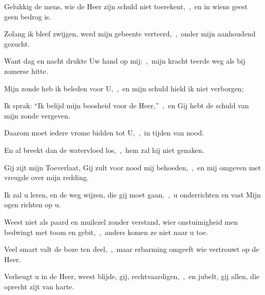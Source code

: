 \documentclass[12pt,twoside,a5paper]{article}
\begin{document}
\begin{halfparskip}
  Gelukkig de mens, wie de Heer zijn schuld niet toerekent,~\sep\ en in wiens geest geen bedrog is.

  Zolang ik bleef zwijgen, werd mijn gebeente verteerd,~\sep\ onder mijn aanhoudend gezucht.

  Want dag en nacht drukte Uw hand op mij;~\sep\ mijn kracht teerde weg als bij zomerse hitte.

  Mijn zonde heb ik beleden voor U,~\sep\ en mijn schuld hield ik niet verborgen;

  Ik sprak: ``Ik belijd mijn boosheid voor de Heer,''~\sep\ en Gij hebt de schuld van mijn zonde vergeven.

  Daarom moet iedere vrome bidden tot U,~\sep\ in tijden van nood.

  En al breekt dan de watervloed los,~\sep\ hem zal hij niet genaken.

  Gij zijt mijn Toeverlaat, Gij zult voor nood mij behoeden,~\sep\ en mij omgeven met vreugde over mijn redding.

  Ik zal u leren, en de weg wijzen, die gij moet gaan,~\sep\ u onderrichten en vast Mijn ogen richten op u.

  Weest niet als paard en muilezel zonder verstand, wier onstuimigheid men bedwingt met toom en gebit,~\sep\ anders komen ze niet naar u toe.

  Veel smart valt de boze ten deel,~\sep\ maar erbarming omgeeft wie vertrouwt op de Heer.

  Verheugt u in de Heer, weest blijde, gij, rechtvaardigen,~\sep\ en jubelt, gij allen, die oprecht zijt van harte.
\end{halfparskip}
\end{document}
